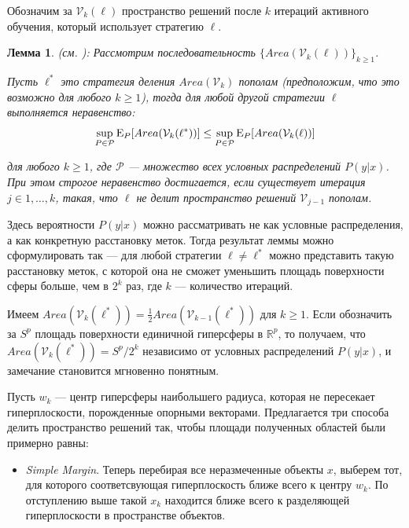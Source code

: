 \documentclass[specialist, 12pt, href]{article}
\newtheorem{lemma}{Лемма}[section]
\begin{document}
Обозначим за \(\mathcal{V}_k(\ell)\) пространство решений после \(k\) итераций активного обучения,
который использует стратегию \(\ell\).

\begin{lemma}{\rm (см. \cite{TongKoller})}:
Рассмотрим последовательность \(\{Area(\mathcal{V}_k(\ell))\}_{k \geq 1}\).

Пусть  \(\ell^*\) это стратегия деления \(Area(\mathcal{V}_k)\)
пополам (предположим, что это возможно для любого $k\geq 1$), тогда для любой другой стратегии
\(\ell\) выполняется неравенство:
\[\sup_{P \in \mathcal{P}} {\rm E}_P[Area(\mathcal{V}_k(\ell^*))] \leq \sup_{P \in \mathcal{P}} {\rm E}_P[Area(\mathcal{V}_k(\ell))]\]

для любого \(k \geq 1\), где \(\mathcal{P}\) --- множество всех условных
распределений \(P(y|x)\). При этом строгое неравенство достигается, если
существует итерация \(j \in 1,\ldots, k\), такая, что \(\ell\) не делит
пространство решений \(\mathcal{V}_{j - 1}\) пополам.
\end{lemma}

Здесь вероятности $P(y|x)$ можно рассматривать не как условные распределения, а как конкретную расстановку меток. Тогда результат леммы можно сформулировать так --- для любой стратегии $\ell \neq \ell^*$ можно представить такую расстановку меток, с которой она не  сможет уменьшить площадь поверхности сферы больше, чем в \(2^k\) раз, где \(k\) --- количество итераций. 

Имеем
\(Area(\mathcal{V}_{k}(\ell^*)) = \frac{1}{2}Area(\mathcal{V}_{k - 1}(\ell^*))\) для $k \geq 1$.
Если обозначить за $S^p$ площадь поверхности единичной  гиперсферы в $\mathbb{R}^p$, то получаем, что $Area(\mathcal{V}_{k}(\ell^*)) = S^p/2^k$ независимо от условных распределений \(P(y|x)\), и замечание становится мгновенно понятным.

Пусть \(w_k\) --- центр гиперсферы наибольшего радиуса, которая не пересекает гиперплоскости, порожденные опорными векторами. Предлагается три способа
делить пространство решений так, чтобы площади полученных областей были
примерно равны:

\begin{itemize}
\item
  \emph{Simple Margin}. Теперь перебирая все неразмеченные объекты
  \(x\), выберем тот, для которого соответсвующая гиперплоскость ближе
  всего к центру \(w_k\). По отступлению выше такой \(x_k\) находится
  ближе всего к разделяющей гиперплоскости в пространстве объектов.
\end{itemize}
\end{document}
